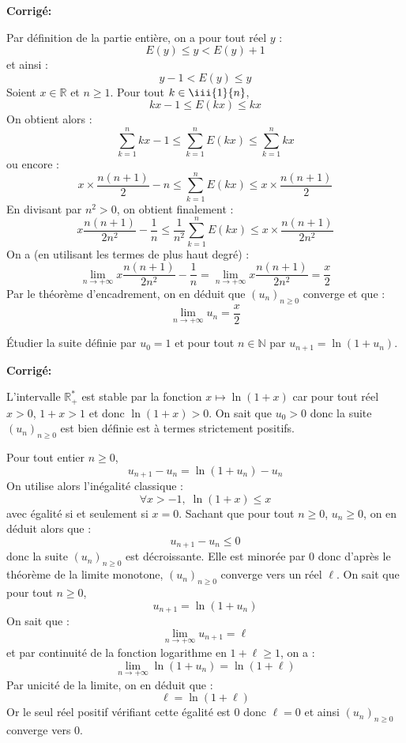 \documentclass[a4paper,twoside,french,10pt]{VcCours}
\newcommand{\corr}{\textbf{Corrigé:}}
\begin{document}
\corr

Par définition de la partie entière, on a pour tout réel $y$ :
$$ E(y) \leq y < E(y) + 1 $$
et ainsi :
$$ y-1 < E(y) \leq y$$
Soient $x \in \mathbb{R}$ et $n \geq 1$. Pour tout $k \in \iii{1}{n}$,
$$ kx - 1 \leq E(kx) \leq kx $$
On obtient alors :
$$ \sum_{k=1}^n kx-1 \leq \sum_{k=1}^n E(kx) \leq \sum_{k=1}^n kx $$
ou encore :
$$ x \times \dfrac{n(n+1)}{2} - n \leq \sum_{k=1}^n E(kx) \leq x \times \dfrac{n(n+1)}{2}$$
En divisant par $n^2 >0$, on obtient finalement :
$$ x \dfrac{n(n+1)}{2n^2} - \dfrac{1}{n} \leq \dfrac{1}{n^2} \sum_{k=1}^n E(kx) \leq x \times \dfrac{n(n+1)}{2n^2}$$
On a (en utilisant les termes de plus haut degré) :
$$ \lim_{n \rightarrow + \infty} x \dfrac{n(n+1)}{2n^2} - \dfrac{1}{n}  = \lim_{n \rightarrow + \infty} x \dfrac{n(n+1)}{2n^2} = \dfrac{x}{2}$$
Par le théorème d'encadrement, on en déduit que $(u_n)_{n \geq 0}$ converge et que :
$$ \lim_{n \rightarrow + \infty} u_n = \dfrac{x}{2}$$

\medskip


\begin{Exercice}{} Étudier la suite définie par $u_0=1$ et pour tout $n \in \mathbb{N}$ par $u_{n+1}=\ln(1+u_n)$.
\end{Exercice} 

\corr

L'intervalle $\mathbb{R}_+^{*}$ est stable par la fonction $x \mapsto \ln(1+x)$ car pour tout réel $x>0$, $1+x>1$ et donc $\ln(1+x)>0$. On sait que $u_0>0$ donc la suite $(u_n)_{n \geq 0}$ est bien définie est à termes strictement positifs.

\medskip

\noindent Pour tout entier $n \geq 0$,
$$u_{n+1}-u_n = \ln(1+u_n)-u_n $$
On utilise alors l'inégalité classique :
$$ \forall x > -1, \; \ln(1+x) \leq x$$
avec égalité si et seulement si $x=0$. Sachant que pour tout $n \geq 0$, $u_n \geq 0$, on en déduit alors que :
$$ u_{n+1}-u_n \leq 0$$
donc la suite $(u_n)_{n \geq 0}$ est décroissante. Elle est minorée par $0$ donc d'après le théorème de la limite monotone, $(u_n)_{n \geq 0}$ converge vers un réel $\ell$. On sait que pour tout $n \geq 0$,
$$ u_{n+1} = \ln(1+u_n)$$
On sait que :
$$ \lim_{n \rightarrow + \infty} u_{n+1} = \ell$$
et par continuité de la fonction logarithme en $1+ \ell \geq 1$, on a :
$$ \lim_{n \rightarrow + \infty} \ln(1+u_n) = \ln(1+ \ell)$$
Par unicité de la limite, on en déduit que :
$$ \ell = \ln(1+\ell)$$
Or le seul réel positif vérifiant cette égalité est $0$ donc $\ell=0$ et ainsi $(u_n)_{n \geq 0}$ converge vers $0$.
\end{document}
